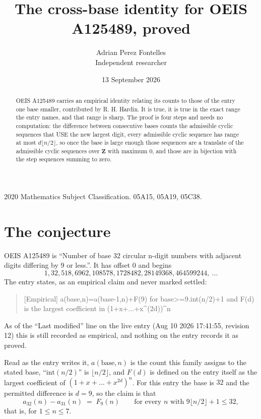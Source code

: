 \documentclass[11pt,a4paper]{article}
\title{The cross-base identity for OEIS A125489, proved}
\author{Adrian Perez Fontelles\\ \small Independent researcher}
\date{13 September 2026}
\theoremstyle{plain}
\theoremstyle{definition}
\begin{document}
\maketitle

\begin{abstract}
OEIS A125489 carries an empirical identity relating its counts to those of the entry one base
smaller, contributed by R. H. Hardin. It is true, it is true in the exact range the entry
names, and that range is sharp. The proof is four steps and needs no computation: the
difference between consecutive bases counts the admissible cyclic sequences that USE the new
largest digit, every admissible cyclic sequence has range at most $d\lfloor n/2\rfloor$, so
once the base is large enough those sequences are a translate of the admissible cyclic
sequences over $\mathbf{Z}$ with maximum $0$, and those are in bijection with the step
sequences summing to zero.
\end{abstract}

\noindent\small 2020 Mathematics Subject Classification. 05A15, 05A19, 05C38.\normalsize

\section{The conjecture}

OEIS A125489 is ``Number of base 32 circular n-digit numbers with adjacent digits differing by 9 or less.''. It has offset $0$ and begins
\[
1, 32, 518, 6962, 108578, 1728482, 28149368, 464599244,\ \dots
\]
The entry states, as an empirical claim and never marked settled:
\begin{quote}
[Empirical] a(base,n)=a(base-1,n)+F(9) for base>=9.int(n/2)+1 and F(d) is the largest coefficient in (1+x+...+x\textasciicircum{}(2d))\textasciicircum{}n
\end{quote}
As of the ``Last modified'' line on the live entry (Aug 10 2026 17:41:55, revision 12)
this is still recorded as empirical, and nothing on the entry records it as proved.

Read as the entry writes it, $a(\mathrm{base},n)$ is the count this family assigns to the
stated base, ``$\mathrm{int}(n/2)$'' is $\lfloor n/2\rfloor$, and $F(d)$ is defined on the
entry itself as the largest coefficient of $(1+x+\dots+x^{2d})^{n}$. For this entry
the base is $32$ and the permitted difference is $d=9$, so the claim is that
\[
a_{32}(n)-a_{31}(n)\;=\;F_{9}(n)
\qquad\text{for every } n \text{ with } 9\lfloor n/2\rfloor+1\le32,
\]
that is, for $1\le n\le7$.
\end{document}
